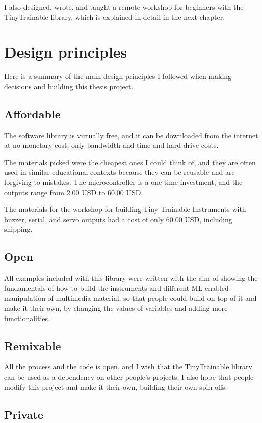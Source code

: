 I also designed, wrote, and taught a remote workshop for beginners with the TinyTrainable library, which is explained in detail in the next chapter.

\section{Design principles}

Here is a summary of the main design principles I followed when making decisions and building this thesis project.

\subsection{Affordable}

The software library is virtually free, and it can be downloaded from the internet at no monetary cost; only bandwidth and time and hard drive costs.

The materials picked were the cheapest ones I could think of, and they are often used in similar educational contexts because they can be reusable and are forgiving to mistakes. The microcontroller is a one-time investment, and the outputs range from 2.00 USD to 60.00 USD. 

The materials for the workshop for building Tiny Trainable Instruments with buzzer, serial, and servo outputs had a cost of only 60.00 USD, including shipping.

\subsection{Open}

All examples included with this library were written with the aim of showing the fundamentals of how to build the instruments and different \acrshort{ML}-enabled manipulation of multimedia material, so that people could build on top of it and make it their own, by changing the values of variables and adding more functionalities.

\subsection{Remixable}

All the process and the code is open, and I wish that the TinyTrainable library can be used as a dependency on other people's projects. I also hope that people modify this project and make it their own, building their own spin-offs. 

\subsection{Private}

